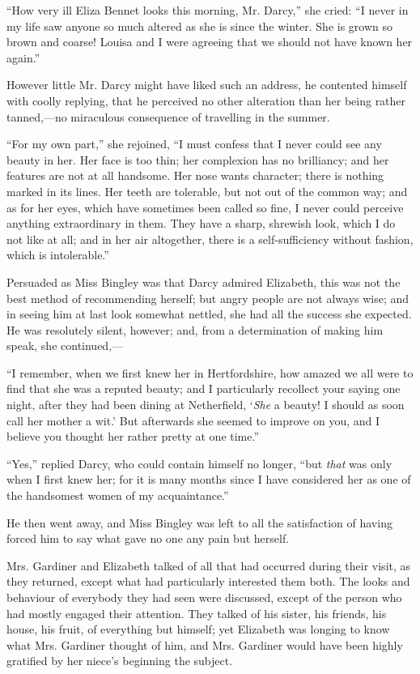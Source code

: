 \documentclass[12pt]{book}
\begin{document}
``How very ill Eliza Bennet looks this morning, Mr. Darcy,'' she cried: ``I never in my life saw anyone so much altered as she is since the winter. She is grown so brown and coarse! Louisa and I were agreeing that we should not have known her again.''

However little Mr. Darcy might have liked such an address, he contented himself with coolly replying, that he perceived no other alteration than her being rather tanned,---no miraculous consequence of travelling in the summer.

``For my own part,'' she rejoined, ``I must confess that I never could see any beauty in her. Her face is too thin; her complexion has no brilliancy; and her features are not at all handsome. Her nose wants character; there is nothing marked in its lines. Her teeth are tolerable, but not out of the common way; and as for her eyes, which have sometimes been called so fine, I never could perceive anything extraordinary in them. They have a sharp, shrewish look, which I do not like at all; and in her air altogether, there is a self-sufficiency without fashion, which is intolerable.''

Persuaded as Miss Bingley was that Darcy admired Elizabeth, this was not the best method of recommending herself; but angry people are not always wise; and in seeing him at last look somewhat nettled, she had all the success she expected. He was resolutely silent, however; and, from a determination of making him speak, she continued,---

``I remember, when we first knew her in Hertfordshire, how amazed we all were to find that she was a reputed beauty; and I particularly recollect your saying one night, after they had been dining at Netherfield, `\textit{She} a beauty! I should as soon call her mother a wit.' But afterwards she seemed to improve on you, and I believe you thought her rather pretty at one time.''

``Yes,'' replied Darcy, who could contain himself no longer, ``but \textit{that} was only when I first knew her; for it is many months since I have considered her as one of the handsomest women of my acquaintance.''

He then went away, and Miss Bingley was left to all the satisfaction of having forced him to say what gave no one any pain but herself.

Mrs. Gardiner and Elizabeth talked of all that had occurred during their visit, as they returned, except what had particularly interested them both. The looks and behaviour of everybody they had seen were discussed, except of the person who had mostly engaged their attention. They talked of his sister, his friends, his house, his fruit, of everything but himself; yet Elizabeth was longing to know what Mrs. Gardiner thought of him, and Mrs. Gardiner would have been highly gratified by her niece's beginning the subject.
\end{document}
